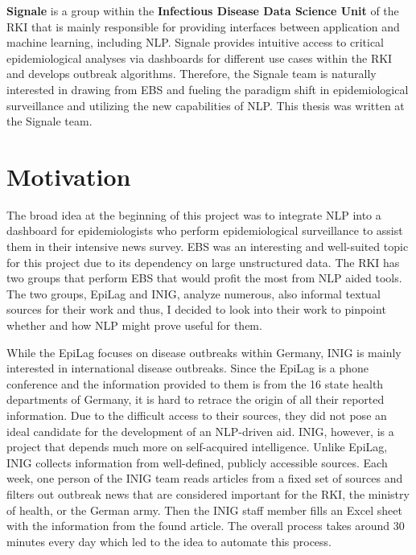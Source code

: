   \textbf{Signale} is a group within the \textbf{Infectious Disease Data Science Unit} of the RKI that is mainly responsible for providing interfaces between application and machine learning, including NLP.
  Signale provides intuitive access to critical epidemiological analyses via dashboards for different use cases within the RKI and develops outbreak algorithms.
  Therefore, the Signale team is naturally interested in drawing from EBS and fueling the paradigm shift in epidemiological surveillance and utilizing the new capabilities of NLP.
  This thesis was written at the Signale team.

\section{Motivation}
  The broad idea at the beginning of this project was to integrate NLP into a dashboard for epidemiologists who perform epidemiological surveillance to assist them in their intensive news survey.
  EBS was an interesting and well-suited topic for this project due to its dependency on large unstructured data.
  The RKI has two groups that perform EBS that would profit the most from NLP aided tools. The two groups, EpiLag and INIG, analyze numerous, also informal textual sources for their work and thus, I decided to look into their work to pinpoint whether and how NLP might prove useful for them.

  While the EpiLag focuses on disease outbreaks within Germany, INIG is mainly interested in international disease outbreaks. Since the EpiLag is a phone conference and the information provided to them is from the 16 state health departments of Germany, it is hard to retrace the origin of all their reported information.
  Due to the difficult access to their sources, they did not pose an ideal candidate for the development of an NLP-driven aid.
  INIG, however, is a project that depends much more on self-acquired intelligence.
  Unlike EpiLag, INIG collects information from well-defined, publicly accessible sources.
  Each week, one person of the INIG team reads articles from a fixed set of sources and filters out outbreak news that are considered important for the RKI, the ministry of health, or the German army.
  Then the INIG staff member fills an Excel sheet with the information from the found article.
  The overall process takes around 30 minutes every day which led to the idea to automate this process.

